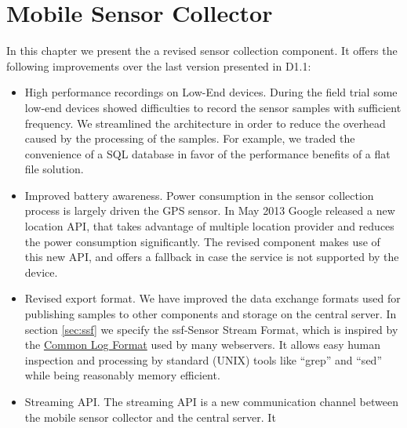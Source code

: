 \label{chap:SensorCollection}

\section{Mobile Sensor Collector}
\label{sec:SensorColllection}

In this chapter we present the a revised sensor collection
component. It offers the following improvements over the last version
presented in D1.1:
\begin{itemize}
\item High performance recordings on Low-End devices. During the field
  trial some low-end devices showed difficulties to record the sensor
  samples with sufficient frequency. We streamlined the architecture
  in order to reduce the overhead caused by the processing of the
  samples. For example, we traded the convenience of a SQL database in
  favor of the performance benefits of a flat file solution.
\item Improved battery awareness. Power consumption in the sensor
  collection process is largely driven the GPS sensor. In May 2013
  Google released a new location API, that takes advantage of multiple
  location provider and reduces the power consumption significantly.
  The revised component makes use of this new API, and offers a
  fallback in case the service is not supported by the device.
\item Revised export format. We have improved the data exchange
  formats used for publishing samples to other components and storage
  on the central server. In section \ref{sec:ssf} we specify the
  ssf-Sensor Stream Format, which is inspired by the
  \href{http://en.wikipedia.org/wiki/Common\_Log\_Format}{Common Log
    Format} used by many webservers. It allows easy human inspection
  and processing by standard (UNIX) tools like ``grep'' and ``sed''
  while being reasonably memory efficient.
\item Streaming API. The streaming API is a new communication channel
  between the mobile sensor collector and the central server. It

\end{itemize}
